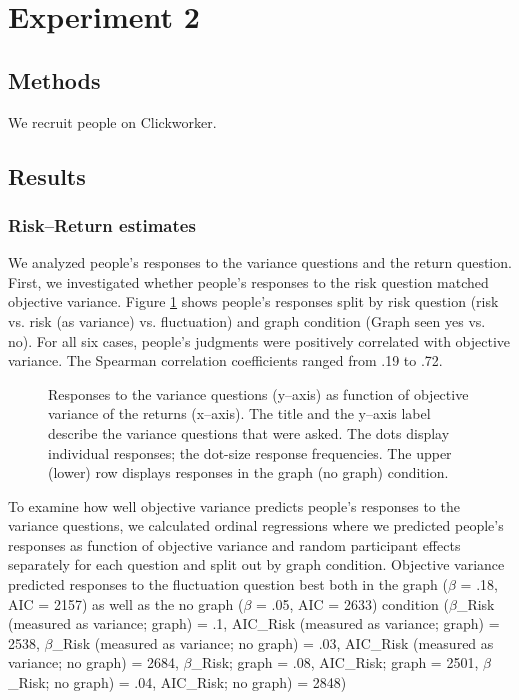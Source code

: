 \documentclass[a4paper,doc, natbib]{apa6} %
\begin{document}
\section{Experiment 2}
\subsection{Methods}
We recruit people on Clickworker. 

\subsection{Results}

\subsubsection{Risk--Return estimates}
We analyzed people's responses to the variance questions and the return question. First, we investigated whether people's responses to the risk question matched objective variance. Figure \ref{fig:rsvoS2} shows people's responses split by risk question (risk vs. risk (as variance) vs. fluctuation) and graph condition (Graph seen yes vs. no). For all six cases, people's judgments were positively correlated with objective variance. The Spearman correlation coefficients ranged from .19 to .72.
\begin{figure}[!htbp] 
  \centering
  \caption{Responses to the variance questions (y--axis) as function of objective variance of the returns (x--axis). The title and the y--axis label describe the variance questions that were asked. The dots display individual responses; the dot-size response frequencies. The upper (lower) row displays responses in the graph (no graph) condition. }
  \label{fig:rsvoS2}
\end{figure}
To examine how well objective variance predicts people's responses to the variance questions, we calculated ordinal regressions where we predicted people's responses as function of objective variance and random participant effects separately for each question and split out by graph condition. Objective variance predicted responses to the fluctuation question best both in the graph ($\beta$ = .18, AIC = 2157) as well as the no graph ($\beta$ = .05, AIC = 2633) condition ($\beta$_{Risk (measured as variance; graph)} = .1, AIC_{Risk (measured as variance; graph)} = 2538, $\beta$_{Risk (measured as variance; no graph)} = .03, AIC_{Risk (measured as variance; no graph)} = 2684, 
$\beta$_{Risk; graph} = .08, AIC_{Risk; graph} = 2501, $\beta$_{Risk; no graph)} = .04, AIC_{Risk; no graph)} = 2848)
\end{document}
